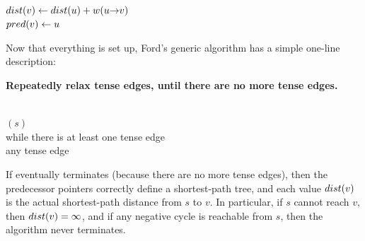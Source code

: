 \begin{pseudocode}
\\
$dist(v) \gets dist(u) + w(u\mathord{\rightarrow}v)$\\
$pred(v) \gets u$
\end{pseudocode}

Now that everything is set up, Ford’s generic algorithm has a simple one-line description:
\begin{problembox}
\textbf{Repeatedly relax tense edges, until there are no more tense edges.}
\end{problembox}

\begin{pseudocode}
\\
$(s)$\\
while there is at least one tense edge\\
\Indent {} any tense edge
\end{pseudocode}
If  eventually terminates (because there are no more tense edges), then the predecessor pointers correctly define a shortest-path tree, and each value $dist(v)$ is the actual shortest-path distance from $s$ to $v$.
In particular, if $s$ cannot reach $v$, then $dist(v) = \infty$, and if any negative cycle is reachable from $s$, then the algorithm never terminates.

